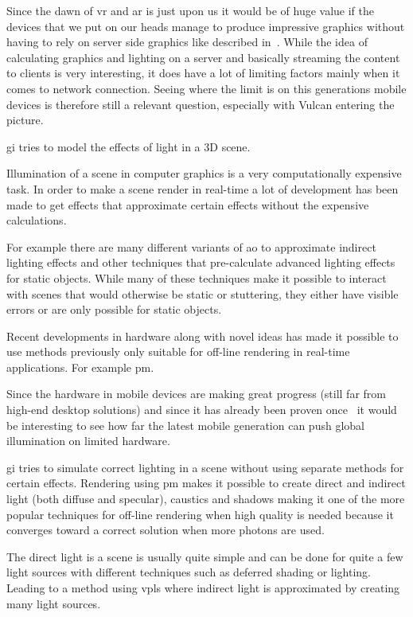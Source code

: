 \documentclass[a4paper, 12pt]{article}
\begin{document}
Since the dawn of \gls{vr} and \gls{ar} is just upon us it would be of huge value if the devices that we put on our heads manage to produce impressive graphics without having to rely on server side graphics like described in~\cite{cloudlight}. While the idea of calculating graphics and lighting on a server and basically streaming the content to clients is very interesting, it does have a lot of limiting factors mainly when it comes to network connection.
Seeing where the limit is on this generations mobile devices is therefore still a relevant question, especially with Vulcan entering the picture.

\gls{gi} tries to model the effects of light in a 3D scene.

Illumination of a scene in computer graphics is a very computationally expensive task. In order to make a scene render in real-time a lot of development has been made to get effects that approximate certain effects without the expensive calculations.

For example there are many different variants of \gls{ao} to approximate indirect lighting effects and other techniques that pre-calculate advanced lighting effects for static objects. While many of these techniques make it possible to interact with scenes that would otherwise be static or stuttering, they either have visible errors or are only possible for static objects.

Recent developments in hardware along with novel ideas has made it possible to use methods previously only suitable for off-line rendering in real-time applications. For example \gls{pm}.

Since the hardware in mobile devices are making great progress (still far from high-end desktop solutions) and since it has already been proven once~\cite{gimobile} it would be interesting to see how far the latest mobile generation can push global illumination on limited hardware.

\gls{gi} tries to simulate correct lighting in a scene without using separate methods for certain effects. Rendering using \gls{pm} makes it possible to create direct and indirect light (both diffuse and specular), caustics and shadows making it one of the more popular techniques for off-line rendering when high quality is needed because it converges toward a correct solution when more photons are used.

The direct light is a scene is usually quite simple and can be done for quite a few light sources with different techniques such as deferred shading or lighting. Leading to a method using \glspl{vpl} where indirect light is approximated by creating many light sources.
\end{document}
